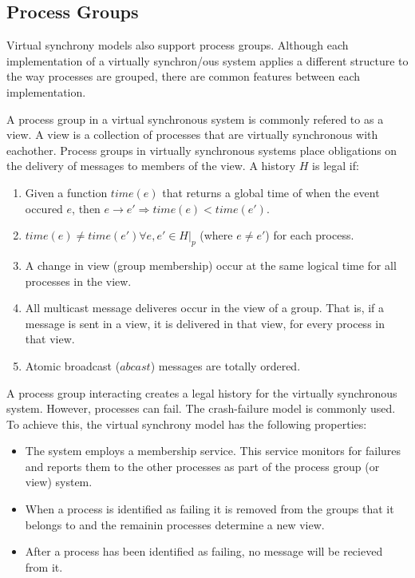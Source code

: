 \subsection{Process Groups}

Virtual synchrony models also support process groups. Although each
implementation of a virtually synchron/ous system applies a different structure
to the way processes are grouped, there are common features between each
implementation.

A process group in a virtual synchronous system is commonly refered to as a
view. A view is a collection of processes that are virtually synchronous
with eachother. Process groups in virtually synchronous systems place 
obligations on the delivery of messages to members of the view. A history
$H$ is legal if:

\begin{enumerate}
    \item Given a function $time(e)$ that returns a global time of when the event occured $e$, then $e \rightarrow e' \Rightarrow time(e) < time(e').$
    \item $time(e) \neq time(e') \forall e, e' \in H|_{p}$ (where $e \neq e'$) for each process.
    \item A change in view (group membership) occur at the same logical time for all processes in the view.
    \item All multicast message deliveres occur in the view of a group. That is, if a message is sent in a view, it is delivered in that view, for every process in that view.
    \item Atomic broadcast ($abcast$) messages are totally ordered.
\end{enumerate}

A process group interacting creates a legal history for the virtually
synchronous system. However, processes can fail. The crash-failure model is
commonly used. To achieve this, the virtual synchrony model has the following
properties:

\begin{itemize}
    \item The system employs a membership service. This service monitors for failures and reports them to the other processes as part of the process group (or view) system.
    \item When a process is identified as failing it is removed from the groups that it belongs to and the remainin processes determine a new view.
    \item After a process has been identified as failing, no message will be recieved from it.
\end{itemize}

